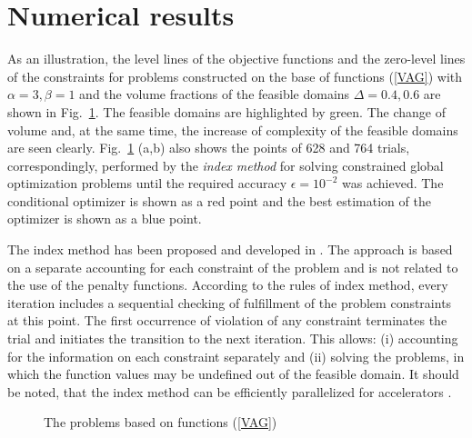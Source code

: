\documentclass{aip-cp}
\begin{document}
\section{Numerical results}

As an illustration, the level lines of the objective functions and the zero-level lines of the constraints for problems constructed on the base of functions (\ref{VAG}) with $\alpha = 3, \beta = 1$ and the volume fractions of the feasible domains $\Delta = 0.4, 0.6$ are shown in Fig.~\ref{fig:VAG}. The feasible domains are highlighted by green. The change of volume and, at the same time, the increase of complexity of the feasible domains are seen clearly. Fig.~\ref{fig:VAG} (a,b) also shows the points of 628 and 764 trials, correspondingly, performed by the \textit{index method} for solving constrained global optimization problems until the required accuracy $\epsilon=10^{-2}$ was achieved. The conditional optimizer is shown as a red point and the best estimation of the optimizer is shown as a blue point.

The index method has been proposed and developed in \cite{Strongin2000,Sergeyev2001,Barkalov2002}. The approach is based on a separate accounting for each constraint of the problem and is not related to the use of the penalty functions. According to the rules of index method, every iteration includes a sequential checking of fulfillment of the problem constraints at this point. The first occurrence of violation of any constraint terminates the trial and initiates the transition to the next iteration. This allows: (i) accounting for the information on each constraint separately and (ii) solving the problems, in which the function values may be undefined out of the feasible domain. It should be noted, that the index method can be efficiently parallelized for accelerators \cite{Barkalov2015,Barkalov2016}.

\begin{figure}
\begin{minipage}{0.5\linewidth}
\end{minipage}
\hfill
\begin{minipage}{0.5\linewidth}
\end{minipage}
\caption{The problems based on functions (\ref{VAG}) }
\label{fig:VAG}
\end{figure}
\end{document}
